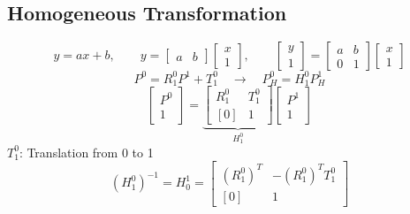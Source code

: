     \subsection{Homogeneous Transformation}
            \vspace{0.5em}
            $$
                y = ax + b, \qquad y = \begin{bmatrix}a&b\end{bmatrix}\begin{bmatrix}x\\1\end{bmatrix}, \qquad \begin{bmatrix}y\\1\end{bmatrix} = \begin{bmatrix}a&b\\0&1\end{bmatrix}\begin{bmatrix}x\\1\end{bmatrix}
            $$
            \vspace{0.5em}
            $$
                P^0 = R_1^0 P^1 + T_1^0 \quad\longrightarrow\quad P_H^0 = H_1^0 P_H^1
            $$
            $$
               \begin{bmatrix} P^0\\1 \end{bmatrix} = \underbrace{\begin{bmatrix} R_1^0 & T_1^0\\ [0] &1 \end{bmatrix}}_{H_1^0} \begin{bmatrix} P^1\\1 \end{bmatrix}
            $$
            {\small $T_1^0$: Translation from 0 to 1}
            \vspace{0.5em}
            $$
                \left(H_1^0\right)^{-1} = H_0^1 = \begin{bmatrix}
                    \left(R_1^0\right)^T & -\left(R_1^0\right)^T T_1^0\\[.5em]
                    [0] & 1
                \end{bmatrix}
            $$
            

        